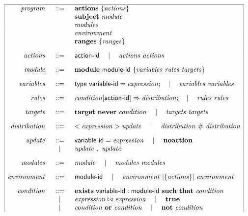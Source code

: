 \begin{table}[htbp!] %
$$
	\begin{array}{|rcl|}
	\hline
	\mathit{program} &::=& \mathbf{actions} \Space \{ \mathit{actions} \} \\
		&& \mathbf{subject} \Space \mathit{module} \\
		&& \mathit{modules} \\
		&& \mathit{environment} \\
		&& \mathbf{ranges} \Space \{ \mathit{ranges} \} 
	\\[.3cm]
	\mathit{actions} &::=& \x{action}\textrm{-}\x{id} \Sep \mathit{actions} \Space \mathit{actions} 
	\\[.3cm]
	\mathit{module} &::=& \mathbf{module} \Space \x{module}\textrm{-}\x{id} \Space \{ \mathit{variables} \Space \mathit{rules} \Space \mathit{targets} \}
	\\[.3cm]
	\mathit{variables} &::=& \x{type} \Space \x{variable}\textrm{-}\x{id} = \mathit{expression}; \Sep \mathit{variables} \Space \mathit{variables}
	\\[.3cm]
	\mathit{rules} &::=& \mathit{condition} [ \x{action}\textrm{-}\x{id}] \Rightarrow \mathit{distribution}; \Sep \mathit{rules} \Space \mathit{rules}
	\\[.3cm]
	\mathit{targets} &::=& \mathbf{target} \Space \mathbf{never} \Space \mathit{condition} \Sep \mathit{targets} \Space \mathit{targets} 
	\\[.3cm]
	\mathit{distribution} &::=& <\mathit{expression}> \mathit{update} \Sep \mathit{distribution} \Space \# \Space \mathit{distribution} 
	\\[.3cm]
	\mathit{update} &::=& \x{variable}\textrm{-}\x{id} = \mathit{expression} \Sep \mathbf{noaction} \\
		& \Sep & \mathit{update} \Space , \Space \mathit{update} 
	\\[.3cm]
	\mathit{modules} &::=& \mathit{module} \Sep \mathit{modules} \Space \mathit{modules}
	\\[.3cm]
	\mathit{environment} &::=& \x{module}\textrm{-}\x{id} \Sep \mathit{environment} \Par{\{\mathit{actions}\}} \mathit{environment}
	\\[.3cm]
	\mathit{condition} &::=& \mathbf{exists} \Space \x{variable}\textrm{-}\x{id}:\x{module}\textrm{-}\x{id} \Space \mathbf{such}\Space\mathbf{that} \Space \mathit{condition} \\
		& \Sep & \mathit{expression} \bowtie \mathit{expression} \Sep \mathbf{true} \\
		& \Sep & \mathit{condition} \Space \mathbf{or} \Space \mathit{condition} \Sep \mathbf{not} \Space \mathit{condition} \\

\end{array}$$
\end{table}
